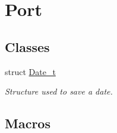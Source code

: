 \hypertarget{group___serial}{}\section{Port}
\label{group___serial}
\subsection*{Classes}
\begin{DoxyCompactItemize}
\item 
struct \hyperlink{struct_date__t}{Date\+\_\+t}
\begin{DoxyCompactList}\small\item\em Structure used to save a date. \end{DoxyCompactList}\end{DoxyCompactItemize}
\subsection*{Macros}
